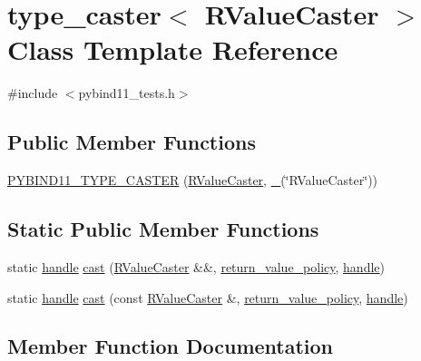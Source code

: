 \hypertarget{classtype__caster_3_01_r_value_caster_01_4}{}\section{type\+\_\+caster$<$ R\+Value\+Caster $>$ Class Template Reference}
\label{classtype__caster_3_01_r_value_caster_01_4}


{\ttfamily \#include $<$pybind11\+\_\+tests.\+h$>$}

\subsection*{Public Member Functions}
\begin{DoxyCompactItemize}
\item 
\mbox{\hyperlink{classtype__caster_3_01_r_value_caster_01_4_a4c1ab8ffd92e6fcda655f0b955edecd0}{P\+Y\+B\+I\+N\+D11\+\_\+\+T\+Y\+P\+E\+\_\+\+C\+A\+S\+T\+ER}} (\mbox{\hyperlink{struct_r_value_caster}{R\+Value\+Caster}}, \mbox{\hyperlink{descr_8h_af114703e20c6527e87163eb2798f74b8}{\+\_\+}}(\char`\"{}R\+Value\+Caster\char`\"{}))
\end{DoxyCompactItemize}
\subsection*{Static Public Member Functions}
\begin{DoxyCompactItemize}
\item 
static \mbox{\hyperlink{classhandle}{handle}} \mbox{\hyperlink{classtype__caster_3_01_r_value_caster_01_4_aaed08af7ab6227a058fe0e9dd2a68cef}{cast}} (\mbox{\hyperlink{struct_r_value_caster}{R\+Value\+Caster}} \&\&, \mbox{\hyperlink{detail_2common_8h_adde72ab1fb0dd4b48a5232c349a53841}{return\+\_\+value\+\_\+policy}}, \mbox{\hyperlink{classhandle}{handle}})
\item 
static \mbox{\hyperlink{classhandle}{handle}} \mbox{\hyperlink{classtype__caster_3_01_r_value_caster_01_4_a5d5e153895d0a28031b94e037224b828}{cast}} (const \mbox{\hyperlink{struct_r_value_caster}{R\+Value\+Caster}} \&, \mbox{\hyperlink{detail_2common_8h_adde72ab1fb0dd4b48a5232c349a53841}{return\+\_\+value\+\_\+policy}}, \mbox{\hyperlink{classhandle}{handle}})
\end{DoxyCompactItemize}


\subsection{Member Function Documentation}
\mbox{\label{classtype__caster_3_01_r_value_caster_01_4_aaed08af7ab6227a058fe0e9dd2a68cef}} 
